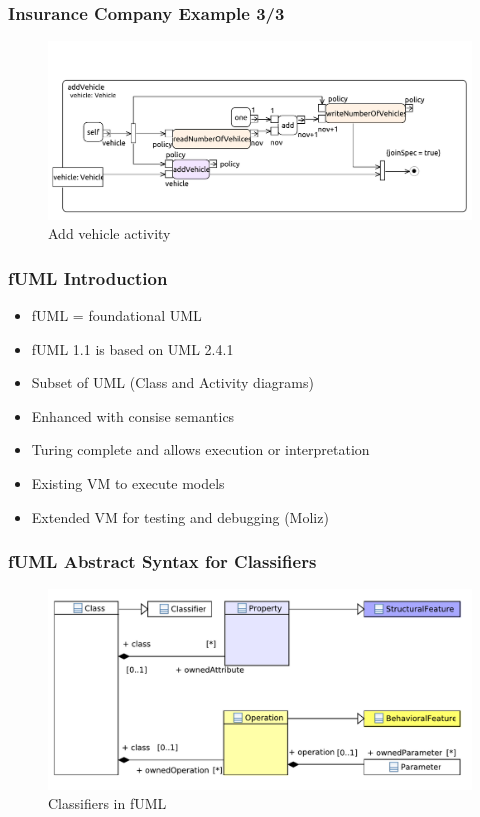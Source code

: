 \documentclass{beamer}
\begin{document}
\begin{frame}
\frametitle{Insurance Company Example 3/3}
\begin{figure}[h!t]
 \centering
 \includegraphics[scale=0.45]{images/insurance_ref/Activity_addVehicle_addVehicle}
 \caption{Add vehicle activity}
 \label{fig:calculatePremium}
\end{figure}
\end{frame}




\begin{frame}
\frametitle{fUML Introduction}
\begin{itemize}
 \item fUML = foundational UML \cite{man:FUML}
 \item fUML 1.1 is based on UML 2.4.1
 \item Subset of UML (Class and Activity diagrams)
 \item Enhanced with consise semantics
 \item Turing complete and allows execution or interpretation
 \item Existing VM to execute models
 \item Extended VM for testing and debugging (Moliz) \cite{DBLP:conf/models/MayerhoferLK12}
\end{itemize}
\end{frame}

\begin{frame}
\frametitle{fUML Abstract Syntax for Classifiers}
\begin{figure}[h!t]
 \centering
 \includegraphics[scale=0.5]{images/Model_Model_Classifiers}
 \caption{Classifiers in fUML}
 \label{fig:classifiers}
\end{figure}
\end{frame}
\end{document}

